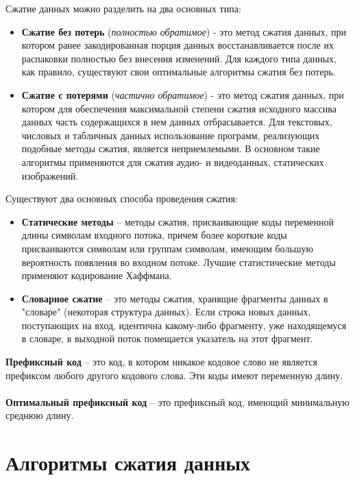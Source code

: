 Сжатие данных можно разделить на два основных типа:
\begin{itemize}
\item \textbf{Сжатие без потерь} (\emph{полностью обратимое}) - это метод сжатия данных, при котором ранее закодированная порция данных восстанавливается после их распаковки полностью без внесения изменений. Для каждого типа данных, как правило, существуют свои оптимальные алгоритмы сжатия без потерь.
\item \textbf{Сжатие с потерями} (\emph{частично обратимое}) -  это метод сжатия данных, при котором для обеспечения максимальной степени сжатия исходного массива данных часть содержащихся в нем данных отбрасывается. Для текстовых, числовых и табличных данных использование программ, реализующих подобные методы сжатия, является неприемлемыми. В основном такие алгоритмы применяются для сжатия аудио- и видеоданных, статических изображений.
\end{itemize}
Существуют два основных способа проведения сжатия:
\begin{itemize}
\item \textbf{Статические методы} -- методы сжатия, присваивающие коды переменной длины символам входного потока, причем более короткие коды присваиваются символам или группам символам, имеющим большую вероятность появления во входном потоке. Лучшие статистические методы применяют кодирование Хаффмана.
\item \textbf{Словарное сжатие} -- это методы сжатия, хранящие фрагменты данных в "словаре" (некоторая структура данных). Если строка новых данных, поступающих на вход, идентична какому-либо фрагменту, уже находящемуся в словаре, в выходной поток помещается указатель на этот фрагмент. 
\end{itemize}
\textbf{Префиксный код} -- это код, в котором никакое кодовое слово не является префиксом любого другого кодового слова. Эти коды имеют переменную длину.
\\
\\\textbf{Оптимальный префиксный код} -- это префиксный код, имеющий минимальную среднюю длину.
\\
\newpage
\section{Алгоритмы сжатия данных}

